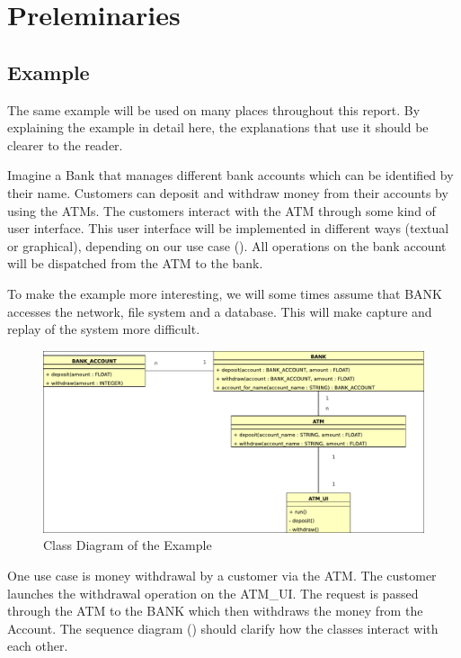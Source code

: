 \chapter{Preleminaries}
\section{Example}
The same example will be used on many places throughout this report. By explaining the example in detail here, the explanations that use it should be clearer to the reader.

Imagine a Bank that manages different bank accounts which can be identified by their name. Customers can deposit and withdraw money from their accounts by using the ATMs. The customers interact with the ATM through some kind of user interface. This user interface will be implemented in different ways (textual or graphical), depending on our use case (). All operations on the bank account will be dispatched from the ATM to the bank. 

To make the example more interesting, we will some times assume that BANK accesses the network, file system and a database. This will make capture and replay of the system more difficult. %

 \begin{figure}[ht]
   \centering
   \includegraphics[width=1\textwidth]{illustrations/example_class_diagram}
   \caption{Class Diagram of the Example}
   \label{fig:example_withdraw_sequence}
\end{figure}

One use case is money withdrawal by a customer via the ATM. The customer launches the withdrawal operation on the ATM\_UI. The request is passed through the ATM to the BANK which then withdraws the money from the Account. The sequence diagram () should clarify how the classes interact with each other.

